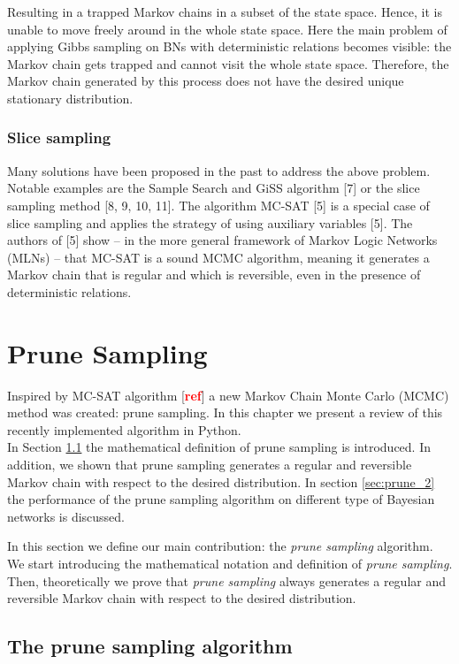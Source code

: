 \documentclass[a4paper, twoside, 11pt]{report}
\theoremstyle{plain}
\theoremstyle{definition}
\theoremstyle{remark}
\newcommand{\red}[1]{{\textcolor{red}{#1}}}
\begin{document}
Resulting in a trapped Markov chains in a subset of the state space. Hence, it is unable to move freely around in the whole state space. Here the main problem of applying Gibbs sampling on BNs with deterministic relations becomes visible: the Markov chain gets trapped and cannot visit the whole state space. Therefore, the Markov chain generated by this process does not have the desired unique stationary distribution.

\subsection{Slice sampling}
Many solutions have been proposed in the past to address the above problem. Notable examples are the Sample Search and GiSS algorithm [7] or the slice sampling method [8, 9, 10, 11]. The algorithm MC-SAT [5] is a special case of slice sampling and applies the strategy of using auxiliary variables [5]. The authors of [5] show -- in the more general framework of Markov Logic Networks (MLNs) -- that MC-SAT is a sound MCMC algorithm, meaning it generates a Markov chain that is regular and which is reversible, even in the presence of deterministic relations.

\chapter{Prune Sampling}
Inspired by MC-SAT algorithm [\red{\textbf{ref}}] a new Markov Chain Monte Carlo (MCMC) method was created: prune sampling. In this chapter we present a review of this recently implemented algorithm in Python. \\
In Section \ref{sec:prune_1} the mathematical definition of prune sampling is introduced. In addition, we shown that prune sampling generates a regular and reversible Markov chain with respect to the desired distribution. In section \ref{sec:prune_2} the performance of the prune sampling algorithm on different type of Bayesian networks is discussed. 

In this section we define our main contribution: the \textit{prune sampling} algorithm. We start introducing the mathematical notation and definition of \textit{prune sampling}. Then, theoretically we prove that \textit{prune sampling} always generates a regular and reversible Markov chain with respect to the desired distribution. 

\section{The prune sampling algorithm}\label{sec:prune_1}
\end{document}

